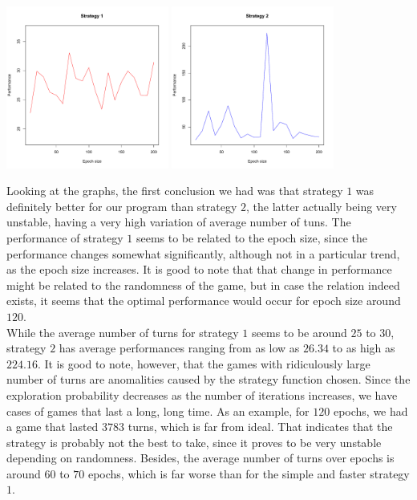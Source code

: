 \documentclass{article}
\begin{document}
\begin{enumerate}
\begin{enumerate}[(a)]
			 \begin{center}
			 	\includegraphics[width=0.4\textwidth]{graph1} \includegraphics[width=0.4\textwidth]{graph2}
			 \end{center}
			 
			 Looking at the graphs, the first conclusion we had was that strategy $1$ was definitely better for our program than strategy $2$, the latter actually being very unstable, having a very high variation of average number of tuns. The performance of strategy $1$ seems to be related to the epoch size, since the performance changes somewhat significantly, although not in a particular trend, as the epoch size increases. It is good to note that that change in performance might be related to the randomness of the game, but in case the relation indeed exists, it seems that the optimal performance would occur for epoch size around $120$.\\
			 
			 While the average number of turns for strategy $1$ seems to be around $25$ to $30$, strategy $2$ has average performances ranging from as low as $26.34$ to as high as $224.16$. It is good to note, however, that the games with ridiculously large number of turns are anomalities caused by the strategy function chosen. Since the exploration probability decreases as the number of iterations increases, we have cases of games that last a long, long time. As an example, for $120$ epochs, we had a game that lasted $3783$ turns, which is far from ideal. That indicates that the strategy is probably not the best to take, since it proves to be very unstable depending on randomness. Besides, the average number of turns over epochs is around $60$ to $70$ epochs, which is far worse than for the simple and faster strategy $1$.\\
                

\end{enumerate}
\end{enumerate}
\end{document}
